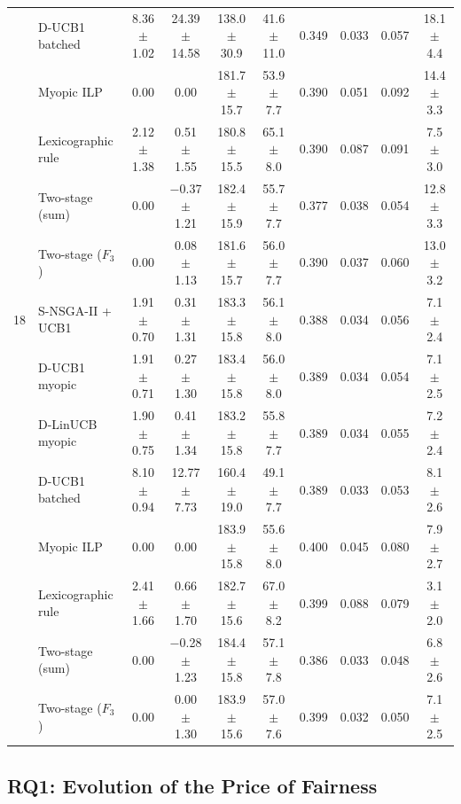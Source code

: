 \documentclass[journal]{IEEEtran}
\begin{document}
\begin{table}[!htbp]
\begin{tabular}{clcccccccc}
 & D-UCB1 batched     & 8.36 $\pm$ 1.02 & 24.39 $\pm$ 14.58  & 138.0 $\pm$ 30.9 & 41.6 $\pm$ 11.0 & 0.349 & 0.033 & 0.057 & 18.1 $\pm$ 4.4 \\
 & Myopic ILP         & 0.00            & 0.00               & 181.7 $\pm$ 15.7 & 53.9 $\pm$ 7.7 & 0.390 & 0.051 & 0.092 & 14.4 $\pm$ 3.3 \\
 & Lexicographic rule & 2.12 $\pm$ 1.38 & 0.51 $\pm$ 1.55    & 180.8 $\pm$ 15.5 & 65.1 $\pm$ 8.0 & 0.390 & 0.087 & 0.091 & 7.5 $\pm$ 3.0 \\
 & Two-stage (sum)    & 0.00            & $-$0.37 $\pm$ 1.21 & 182.4 $\pm$ 15.9 & 55.7 $\pm$ 7.7 & 0.377 & 0.038 & 0.054 & 12.8 $\pm$ 3.3 \\
 & Two-stage ($F_3$)  & 0.00            & 0.08 $\pm$ 1.13    & 181.6 $\pm$ 15.7 & 56.0 $\pm$ 7.7 & 0.390 & 0.037 & 0.060 & 13.0 $\pm$ 3.2 \\
\midrule
18 & S-NSGA-II + UCB1   & 1.91 $\pm$ 0.70 & 0.31 $\pm$ 1.31    & 183.3 $\pm$ 15.8 & 56.1 $\pm$ 8.0 & 0.388 & 0.034 & 0.056 & 7.1 $\pm$ 2.4 \\
 & D-UCB1 myopic      & 1.91 $\pm$ 0.71 & 0.27 $\pm$ 1.30    & 183.4 $\pm$ 15.8 & 56.0 $\pm$ 8.0 & 0.389 & 0.034 & 0.054 & 7.1 $\pm$ 2.5 \\
 & D-LinUCB myopic    & 1.90 $\pm$ 0.75 & 0.41 $\pm$ 1.34    & 183.2 $\pm$ 15.8 & 55.8 $\pm$ 7.7 & 0.389 & 0.034 & 0.055 & 7.2 $\pm$ 2.4 \\
 & D-UCB1 batched     & 8.10 $\pm$ 0.94 & 12.77 $\pm$ 7.73   & 160.4 $\pm$ 19.0 & 49.1 $\pm$ 7.7 & 0.389 & 0.033 & 0.053 & 8.1 $\pm$ 2.6 \\
 & Myopic ILP         & 0.00            & 0.00               & 183.9 $\pm$ 15.8 & 55.6 $\pm$ 8.0 & 0.400 & 0.045 & 0.080 & 7.9 $\pm$ 2.7 \\
 & Lexicographic rule & 2.41 $\pm$ 1.66 & 0.66 $\pm$ 1.70    & 182.7 $\pm$ 15.6 & 67.0 $\pm$ 8.2 & 0.399 & 0.088 & 0.079 & 3.1 $\pm$ 2.0 \\
 & Two-stage (sum)    & 0.00            & $-$0.28 $\pm$ 1.23 & 184.4 $\pm$ 15.8 & 57.1 $\pm$ 7.8 & 0.386 & 0.033 & 0.048 & 6.8 $\pm$ 2.6 \\
 & Two-stage ($F_3$)  & 0.00            & 0.00 $\pm$ 1.30    & 183.9 $\pm$ 15.6 & 57.0 $\pm$ 7.6 & 0.399 & 0.032 & 0.050 & 7.1 $\pm$ 2.5 \\
\bottomrule
\end{tabular}
\end{table}

\subsection{RQ1: Evolution of the Price of Fairness}
\label{sec:results:rq1}
\end{document}
